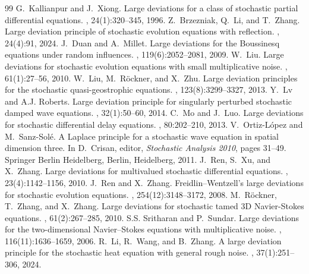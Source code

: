 \documentclass[10pt,a4paper]{amsart}
\numberwithin{equation}{section}
\begin{document}
\begin{thebibliography}{99}
 G.~Kallianpur and J.~Xiong. \newblock Large deviations for a class of stochastic partial differential equations. , 24(1):320--345, 1996.
 Z.~Brzezniak, Q.~Li, and T.~Zhang. \newblock Large deviation principle of stochastic evolution equations with reflection. , 24(4):91, 2024.
 J.~Duan and A.~Millet. \newblock Large deviations for the {Boussinesq} equations under random influences. , 119(6):2052--2081, 2009.
 W.~Liu. \newblock Large deviations for stochastic evolution equations with small multiplicative noise. , 61(1):27--56, 2010.
 W.~Liu, M.~Röckner, and X.~Zhu. \newblock Large deviation principles for the stochastic quasi-geostrophic equations. , 123(8):3299--3327, 2013.
 Y.~Lv and A.J. Roberts. \newblock Large deviation principle for singularly perturbed stochastic damped wave equations. , 32(1):50--60, 2014.
 C.~Mo and J.~Luo. \newblock Large deviations for stochastic differential delay equations. , 80:202--210, 2013.
 V.~Ortiz-López and M.~Sanz-Solé. \newblock A {L}aplace principle for a stochastic wave equation in spatial dimension three. \newblock In D.~Crisan, editor, {\em Stochastic {Analysis} 2010}, pages 31--49. Springer Berlin Heidelberg, Berlin, Heidelberg, 2011.
 J.~Ren, S.~Xu, and X.~Zhang. \newblock Large deviations for multivalued stochastic differential equations. , 23(4):1142--1156, 2010.
 J.~Ren and X.~Zhang. \newblock Freidlin–{Wentzell}'s large deviations for stochastic evolution equations. , 254(12):3148--3172, 2008.
 M.~Röckner, T.~Zhang, and X.~Zhang. \newblock Large deviations for stochastic tamed {3D} {Navier}-{Stokes} equations. , 61(2):267--285, 2010.
 S.S. Sritharan and P.~Sundar. \newblock Large deviations for the two-dimensional {Navier}–{Stokes} equations with multiplicative noise. , 116(11):1636--1659, 2006.
 R.~Li, R.~Wang, and B.~Zhang. \newblock A large deviation principle for the stochastic heat equation with general rough noise. , 37(1):251--306, 2024.

\end{thebibliography}
\end{document}
